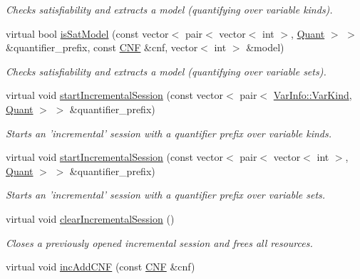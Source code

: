 \begin{DoxyCompactItemize}
\begin{DoxyCompactList}\small\item\em Checks satisfiability and extracts a model (quantifying over variable kinds). \end{DoxyCompactList}\item 
virtual bool \hyperlink{classDepQBFApiInc_a61c1de56b115323863c326b248d10acb}{is\-Sat\-Model} (const vector$<$ pair$<$ vector$<$ int $>$, \hyperlink{classQBFSolver_ac091e263cb55286cc07b2451bcf4d3c7}{Quant} $>$ $>$ \&quantifier\-\_\-prefix, const \hyperlink{classCNF}{C\-N\-F} \&cnf, vector$<$ int $>$ \&model)
\begin{DoxyCompactList}\small\item\em Checks satisfiability and extracts a model (quantifying over variable sets). \end{DoxyCompactList}\item 
virtual void \hyperlink{classDepQBFApiInc_afdeb5e6df1be1c52ba79a993b47bebb5}{start\-Incremental\-Session} (const vector$<$ pair$<$ \hyperlink{classVarInfo_a64d1da76cf84fe674e5fef9764ef11cf}{Var\-Info\-::\-Var\-Kind}, \hyperlink{classQBFSolver_ac091e263cb55286cc07b2451bcf4d3c7}{Quant} $>$ $>$ \&quantifier\-\_\-prefix)
\begin{DoxyCompactList}\small\item\em Starts an 'incremental' session with a quantifier prefix over variable kinds. \end{DoxyCompactList}\item 
virtual void \hyperlink{classDepQBFApiInc_a7e465808e8b3a704e9c0f20a1ed802c2}{start\-Incremental\-Session} (const vector$<$ pair$<$ vector$<$ int $>$, \hyperlink{classQBFSolver_ac091e263cb55286cc07b2451bcf4d3c7}{Quant} $>$ $>$ \&quantifier\-\_\-prefix)
\begin{DoxyCompactList}\small\item\em Starts an 'incremental' session with a quantifier prefix over variable sets. \end{DoxyCompactList}\item 
virtual void \hyperlink{classDepQBFApiInc_a352b4620501803cc6a267d458ee9c57d}{clear\-Incremental\-Session} ()
\begin{DoxyCompactList}\small\item\em Closes a previously opened incremental session and frees all resources. \end{DoxyCompactList}\item 
virtual void \hyperlink{classDepQBFApiInc_af6eacf0be1c7f0f29eeb02fefa63f3f9}{inc\-Add\-C\-N\-F} (const \hyperlink{classCNF}{C\-N\-F} \&cnf)

\end{DoxyCompactItemize}
